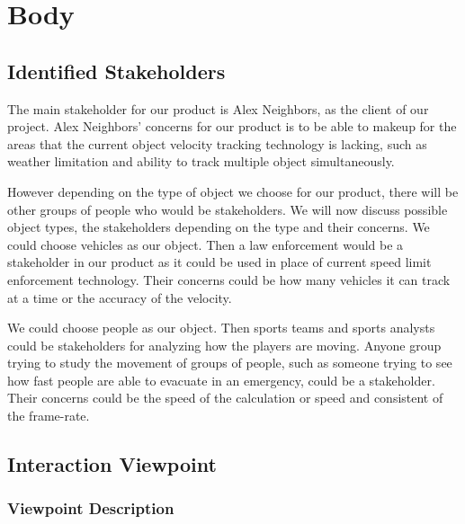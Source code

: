 \documentclass[letterpaper,10pt,onecolumn,draftclsnofoot]{IEEEtran}
\begin{document}
\section{Body}
\subsection{Identified Stakeholders}
The main stakeholder for our product is Alex Neighbors, as the client of our project.
Alex Neighbors' concerns for our product is to be able to makeup for the areas that the current object velocity tracking technology is lacking, such as weather limitation and ability to track multiple object simultaneously. 

However depending on the type of object we choose for our product, there will be other groups of people who would be stakeholders. 
We will now discuss possible object types, the stakeholders depending on the type and their concerns.
We could choose vehicles as our object. Then a law enforcement would be a stakeholder in our product as it could be used in place of current speed limit enforcement technology.
Their concerns could be how many vehicles it can track at a time or the accuracy of the velocity.

We could choose people as our object. Then sports teams and sports analysts could be stakeholders for analyzing how the players are moving. Anyone group trying to study the movement of groups of people, such as someone trying to see how fast people are able to evacuate in an emergency, could be a stakeholder.
Their concerns could be the speed of the calculation or speed and consistent of the frame-rate.


\subsection{Interaction Viewpoint}
\subsubsection{Viewpoint Description}
\end{document}
